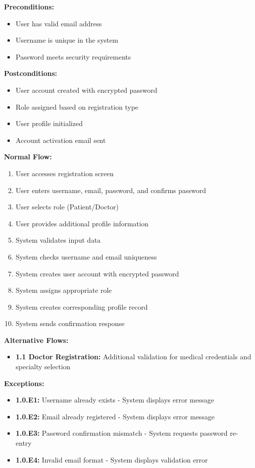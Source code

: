 \documentclass[12pt,a4paper]{article}
\begin{document}
\textbf{Preconditions:}
\begin{itemize}
    \item User has valid email address
    \item Username is unique in the system
    \item Password meets security requirements
\end{itemize}

\textbf{Postconditions:}
\begin{itemize}
    \item User account created with encrypted password
    \item Role assigned based on registration type
    \item User profile initialized
    \item Account activation email sent
\end{itemize}

\textbf{Normal Flow:}
\begin{enumerate}
    \item User accesses registration screen
    \item User enters username, email, password, and confirms password
    \item User selects role (Patient/Doctor)
    \item User provides additional profile information
    \item System validates input data
    \item System checks username and email uniqueness
    \item System creates user account with encrypted password
    \item System assigns appropriate role
    \item System creates corresponding profile record
    \item System sends confirmation response
\end{enumerate}

\textbf{Alternative Flows:}
\begin{itemize}
    \item \textbf{1.1 Doctor Registration:} Additional validation for medical credentials and specialty selection
\end{itemize}

\textbf{Exceptions:}
\begin{itemize}
    \item \textbf{1.0.E1:} Username already exists - System displays error message
    \item \textbf{1.0.E2:} Email already registered - System displays error message
    \item \textbf{1.0.E3:} Password confirmation mismatch - System requests password re-entry
    \item \textbf{1.0.E4:} Invalid email format - System displays validation error
\end{itemize}
\end{document}
